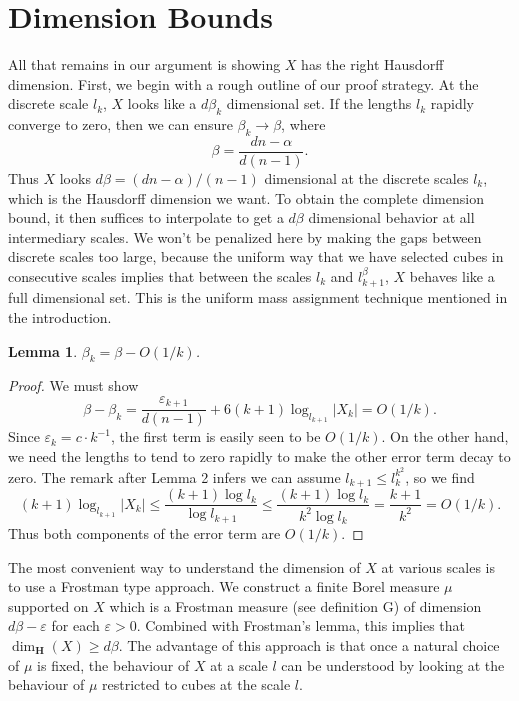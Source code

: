 \documentclass[dvipsnames]{article}
\theoremstyle{plain}
\newtheorem{lemma}{Lemma}
\theoremstyle{plain}
\begin{document}
\section{Dimension Bounds}

All that remains in our argument is showing $X$ has the right Hausdorff dimension. First, we begin with a rough outline of our proof strategy. At the discrete scale $l_k$, $X$ looks like a $d \beta_k$ dimensional set. If the lengths $l_k$ rapidly converge to zero, then we can ensure $\beta_k \to \beta$, where
%
\[ \beta = \frac{dn - \alpha}{d(n - 1)}. \]
%
Thus $X$ looks $d \beta = (dn - \alpha) / (n-1)$ dimensional at the discrete scales $l_k$, which is the Hausdorff dimension we want. To obtain the complete dimension bound, it then suffices to interpolate to get a $d\beta$ dimensional behavior at all intermediary scales. We won't be penalized here by making the gaps between discrete scales too large, because the uniform way that we have selected cubes in consecutive scales implies that between the scales $l_k$ and $l_{k+1}^\beta$, $X$ behaves like a full dimensional set. This is the uniform mass assignment technique mentioned in the introduction.

\begin{lemma}
	$\beta_k = \beta - O(1/k)$.
\end{lemma}
\begin{proof}
	We must show
	\[ \beta - \beta_k = \frac{\varepsilon_{k+1}}{d(n-1)} + 6(k+1) \log_{l_{k+1}} |X_k| = O(1/k). \]
	Since $\varepsilon_k = c \cdot k^{-1}$, the first term is easily seen to be $O(1/k)$. On the other hand, we need the lengths to tend to zero rapidly to make the other error term decay to zero. The remark after Lemma 2 infers we can assume $l_{k+1} \leq l_k^{k^2}$, so we find
	\[ (k+1) \log_{l_{k+1}} |X_k| \leq \frac{(k+1) \log l_k}{\log l_{k+1}} \leq \frac{(k+1) \log l_k}{k^2 \log l_k} = \frac{k+1}{k^2} = O(1/k). \]
	Thus both components of the error term are $O(1/k)$.
\end{proof}

The most convenient way to understand the dimension of $X$ at various scales is to use a Frostman type approach. We construct a finite Borel measure $\mu$ supported on $X$ which is a Frostman measure (see definition G) of dimension $d \beta - \varepsilon$ for each $\varepsilon > 0$. Combined with Frostman's lemma, this implies that $\dim_{\mathbf{H}}(X) \geq d \beta$. The advantage of this approach is that once a natural choice of $\mu$ is fixed, the behaviour of $X$ at a scale $l$ can be understood by looking at the behaviour of $\mu$ restricted to cubes at the scale $l$.
\end{document}

